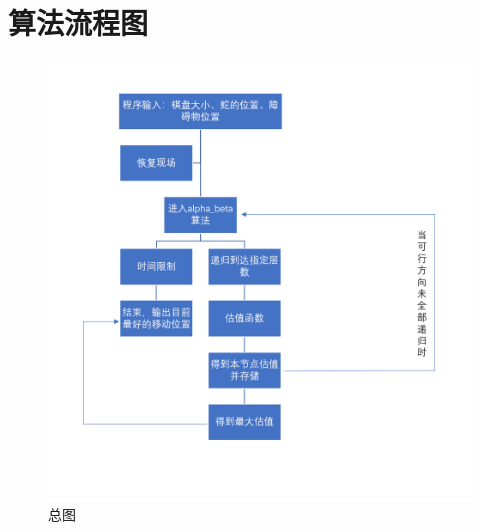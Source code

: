 \documentclass{ctexrep}
\begin{document}
\section{算法流程图}
\begin{figure}[H] %
    \centering %
    \includegraphics[width=1\textwidth]{1.png} %
    \caption{总图} %
    \label{wolf} %
\end{figure}%
\end{document}
